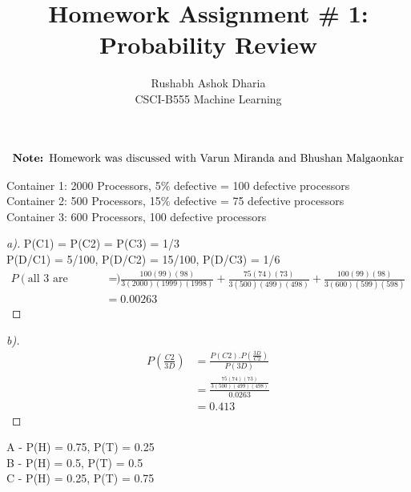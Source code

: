 \documentclass[12pt]{article}
\newenvironment{theorem}[2][Theorem]{\begin{trivlist}
\item[\hskip \labelsep {\bfseries #1}\hskip \labelsep {\bfseries #2.}]}{\end{trivlist}}
\begin{document}
 
 
 
\title{Homework Assignment # 1: Probability Review}%
\author{Rushabh Ashok Dharia\\ %
CSCI-B555 Machine Learning} %
 
\maketitle

\begin{multline*}
    \text{\textbf{Note: }Homework was discussed with Varun Miranda and Bhushan Malgaonkar}
\end{multline*} 
 
\begin{theorem}[Ans]{1}
Container 1: 2000 Processors, 5\% defective = 100 defective processors\\
Container 2: 500 Processors, 15\% defective = 75  defective processors\\
Container 3: 600 Processors, 100  defective processors
 
\begin{proof}[a)]
P(C1) = P(C2) = P(C3) = 1/3 \\
P(D/C1) = 5/100, P(D/C2) = 15/100, P(D/C3) = 1/6 \\
\begin{align*}
P(\text{all 3 are defective}) 
& = \frac{100(99)(98)}{3(2000)(1999)(1998)} + \frac{75(74)(73)}{3(500)(499)(498)} + \frac{100(99)(98)}{3(600)(599)(598)} \\
& = 0.00263
\end{align*}
\end{proof}

\begin{proof}[b)]
\begin{align*}
P(\frac{C2}{3D}) & = \frac{P(C2).P(\frac{3D}{C2})}{P(3D)} \\
& = \frac{\frac{75(74)(73)}{3(500)(499)(498)}}{0.0263} \\
& = 0.413
\end{align*}
\end{proof}
\end{theorem}
\pagebreak
\begin{theorem}[Ans]{2}
A - P(H) = 0.75, P(T) = 0.25 \\
B - P(H) = 0.5, P(T) = 0.5 \\
C - P(H) = 0.25, P(T) = 0.75
\end{theorem}
 
\end{document}
